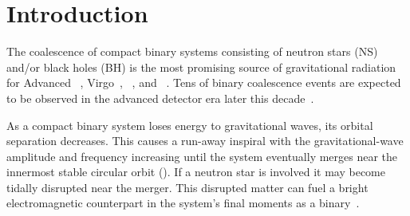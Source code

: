 \section{Introduction}
\label{sec:introduction}


The coalescence of compact binary systems consisting of neutron stars (NS)
and/or black holes (BH) is the most promising source of gravitational radiation
for Advanced \LIGO~\cite{ALIGOWeb}, Virgo~\cite{AVirgoWeb}, \GEO~\cite{GEOWeb},%
%
and \LCGT~\cite{LCGTWeb}.  Tens of binary coalescence events are expected to be
observed in the advanced detector era later this
decade~\cite{Abadie:2010p10836}.

As a compact binary system loses energy to gravitational waves, its orbital
separation decreases. This causes a run-away inspiral with the
gravitational-wave amplitude and frequency increasing until the system
eventually merges near the innermost stable circular orbit (\ISCO).  If a
neutron star is involved it may become tidally disrupted near the merger.  This
disrupted matter can fuel a bright electromagnetic counterpart in the system's
final moments as a binary~\cite{shibata:2007}.

